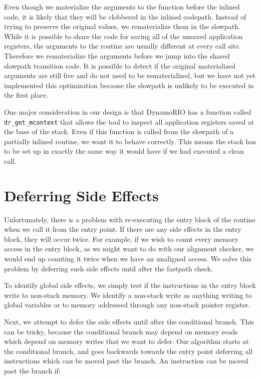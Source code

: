 Even though we materialize the arguments to the function before the inlined
code, it is likely that they will be clobbered in the inlined codepath.  Instead
of trying to preserve the original values, we rematerialize them in the
slowpath.  While it is possible to share the code for saving all of the unsaved
application registers, the arguments to the routine are usually different at
every call site.  Therefore we rematerialize the arguments before we jump into
the shared slowpath transition code.  It is possible to detect if the original
materialized arguments are still live and do not need to be rematerialized, but
we have not yet implemented this optimization because the slowpath is unlikely
to be executed in the first place.

One major consideration in our design is that DynamoRIO has a function called
{\tt dr\_get\_mcontext} that allows the tool to inspect all application
registers saved at the base of the stack.  Even if this function is called from
the slowpath of a partially inlined routine, we want it to behave correctly.
This means the stack has to be set up in exactly the same way it would have if
we had executed a clean call.

\section{Deferring Side Effects}
\label{sec:deferring}

Unfortunately, there is a problem with re-executing the entry block of the
routine when we call it from the entry point.  If there are any side effects in
the entry block, they will occur twice.  For example, if we wish to count every
memory access in the entry block, as we might want to do with our alignment
checker, we would end up counting it twice when we have an unaligned access.  We
solve this problem by deferring such side effects until after the fastpath
check.

To identify global side effects, we simply test if the instructions in the entry
block write to non-stack memory.  We identify a non-stack write as anything
writing to global variables or to memory addressed through any non-stack pointer
register.

Next, we attempt to defer the side effects until after the conditional branch.
This can be tricky, because the conditional branch may depend on memory reads
which depend on memory writes that we want to defer.  Our algorithm starts at
the conditional branch, and goes backwards towards the entry point deferring all
instructions which can be moved past the branch.  An instruction can be moved
past the branch if:

